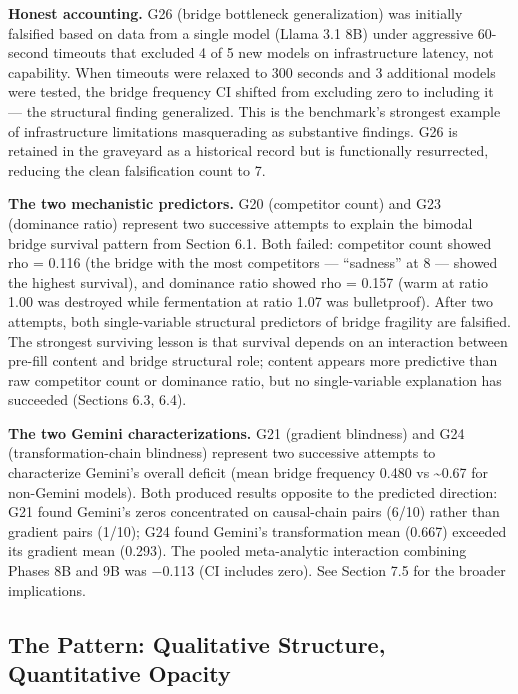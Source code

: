 \textbf{Honest accounting.} G26 (bridge bottleneck generalization) was initially falsified based on data from a single model (Llama 3.1 8B) under aggressive 60-second timeouts that excluded 4 of 5 new models on infrastructure latency, not capability. When timeouts were relaxed to 300 seconds and 3 additional models were tested, the bridge frequency CI shifted from excluding zero to including it --- the structural finding generalized. This is the benchmark's strongest example of infrastructure limitations masquerading as substantive findings. G26 is retained in the graveyard as a historical record but is functionally resurrected, reducing the clean falsification count to 7.

\textbf{The two mechanistic predictors.} G20 (competitor count) and G23 (dominance ratio) represent two successive attempts to explain the bimodal bridge survival pattern from Section 6.1. Both failed: competitor count showed rho = 0.116 (the bridge with the most competitors --- ``sadness'' at 8 --- showed the highest survival), and dominance ratio showed rho = 0.157 (warm at ratio 1.00 was destroyed while fermentation at ratio 1.07 was bulletproof). After two attempts, both single-variable structural predictors of bridge fragility are falsified. The strongest surviving lesson is that survival depends on an interaction between pre-fill content and bridge structural role; content appears more predictive than raw competitor count or dominance ratio, but no single-variable explanation has succeeded (Sections 6.3, 6.4).

\textbf{The two Gemini characterizations.} G21 (gradient blindness) and G24 (transformation-chain blindness) represent two successive attempts to characterize Gemini's overall deficit (mean bridge frequency 0.480 vs \textasciitilde0.67 for non-Gemini models). Both produced results opposite to the predicted direction: G21 found Gemini's zeros concentrated on causal-chain pairs (6/10) rather than gradient pairs (1/10); G24 found Gemini's transformation mean (0.667) exceeded its gradient mean (0.293). The pooled meta-analytic interaction combining Phases 8B and 9B was −0.113 (CI includes zero). See Section 7.5 for the broader implications.

\subsection{The Pattern: Qualitative Structure, Quantitative Opacity}\label{the-pattern-qualitative-structure-quantitative-opacity}

